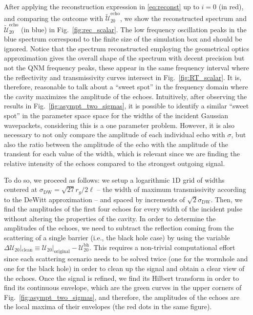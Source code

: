 \documentclass[article,aps,nofootinbib,twocolumn,superscriptaddress]{revtex4-1}
\begin{document}
After applying the reconstruction expression in \eqref{eq:reconst} up to $i=0$ (in red), and comparing the outcome with $\tilde{\mathcal{U}}_{20}^{\mathrm{echo}}$, we show the reconstructed spectrum and $\tilde{\mathcal{U}}_{20}^{\mathrm{echo}}$ (in blue) in Fig.~\ref{fig:rec_scalar}. The low frequency oscillation peaks in the blue spectrum correspond to the finite size of the simulation box and should be ignored. Notice that the spectrum reconstructed employing the geometrical optics approximation gives the overall shape of the spectrum with decent precision but not the QNM frequency peaks, these appear in the same frequency interval where the reflectivity and transmissivity curves intersect in Fig.~\ref{fig:RT_scalar}. It is, therefore, reasonable to talk about a ``sweet spot'' in the frequency domain where the cavity maximizes the amplitude of the echoes. Intuitively, after observing the results in Fig.~\ref{fig:asympt_two_sigmas}, it is possible to identify a similar ``sweet spot'' in the parameter space space for the widths of the incident Gaussian wavepackets, considering this is a one parameter problem. However, it is also necessary to not only compare the amplitude of each individual echo with $\sigma$, but also the ratio between the amplitude of the echo with the amplitude of the transient for each value of the width, which is relevant since we are finding the relative intensity of the echoes compared to the strongest outgoing signal. 

To do so, we proceed as follows: we setup a logarithmic 1D grid of widths centered at $\sigma_{\mathrm{DW}}=\sqrt{27}r_g/2\ell$ --  the width of maximum transmissivity according to the DeWitt approximation \citep{DeWitt:1975ys} -- and spaced by increments of $\sqrt{2}\sigma_{\mathrm{DW}}$. Then, we find the amplitudes of the first four echoes for every width of the incident pulse without altering the properties of the cavity. In order to determine the amplitudes of the echoes, we need to subtract the reflection coming from the scattering of a single barrier (i.e., the black hole case) by using the variable $\Delta\mathcal{U}_{20}|_{\mathrm{clean}}\equiv\mathcal{U}_{20}|_{\mathrm{original}}-\mathcal{U}^{\mathrm{bh}}_{20}$. This requires a non-trivial computational effort since each scattering scenario needs to be solved twice (one for the wormhole and one for the black hole) in order to clean up the signal and obtain a clear view of the echoes. Once the signal is refined, we find its Hilbert transform \citep{1449626} in order to find its continuous envelope, which are the green curves in the upper corners of Fig.~\ref{fig:asympt_two_sigmas}, and therefore, the amplitudes of the echoes are the local maxima of their envelopes (the red dots in the same figure). 
\end{document}
